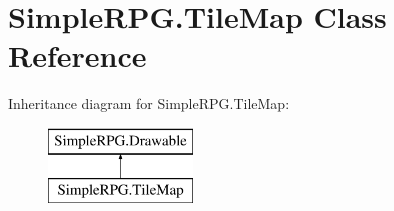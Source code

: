 \hypertarget{class_simple_r_p_g_1_1_tile_map}{\section{Simple\+R\+P\+G.\+Tile\+Map Class Reference}
\label{class_simple_r_p_g_1_1_tile_map}
}
Inheritance diagram for Simple\+R\+P\+G.\+Tile\+Map\+:\begin{figure}[H]
\begin{center}
\leavevmode
\includegraphics[height=2.000000cm]{class_simple_r_p_g_1_1_tile_map}
\end{center}
\end{figure}
